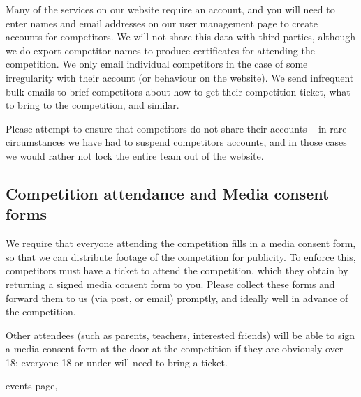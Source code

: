 \documentclass[a4paper]{article}
\begin{document}
Many of the services on our website require an account, and you will need to
enter names and email addresses on our user management page to create accounts
for competitors. We will not share this data with third parties, although we do
export competitor names to produce certificates for attending the competition.
We only email individual competitors in the case of some irregularity with
their account (or behaviour on the website). We send infrequent bulk-emails
to brief competitors about how to get their competition ticket, what to bring
to the competition, and similar.

Please attempt to ensure that competitors do not share their accounts -- in rare
circumstances we have had to suspend competitors accounts, and in those cases
we would rather not lock the entire team out of the website.

\subsection*{Competition attendance and Media consent forms}
 
We require that everyone attending the competition fills in a media consent
form, so that we can distribute footage of the competition for publicity.
To enforce this, competitors must have a ticket to attend the competition,
which they obtain by returning a signed media consent form to you. Please
collect these forms and forward them to us (via post, or email) promptly,
and ideally well in advance of the competition.

Other attendees (such as parents, teachers, interested friends) will be able
to sign a media consent form at the door at the competition if they are
obviously over 18; everyone 18 or under will need to bring a ticket.

events page,
\end{document}
